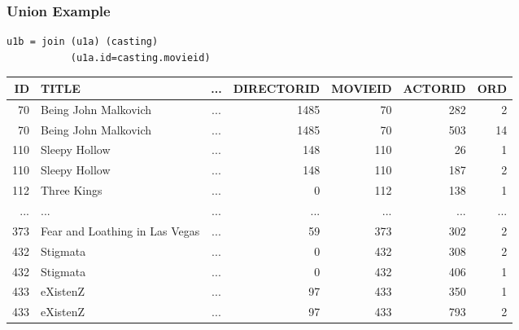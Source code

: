 \documentclass[dvipsnames]{beamer}
\theoremstyle{plain}
\begin{document}
\begin{frame}[fragile]
  \frametitle{Union Example}

  \begin{example}
    \begin{lstlisting}
u1b = join (u1a) (casting)
           (u1a.id=casting.movieid)
    \end{lstlisting}

    \pause
    \begin{tiny}
    \begin{table}
      \begin{tabular}{|r|l|c|r|r|r|r|}\hline
 ID & TITLE                          & ... & DIRECTORID & MOVIEID & ACTORID & ORD\\\hline\hline
 70 & Being John Malkovich           & ... &       1485 &      70 &     282 &   2\\\hline
 70 & Being John Malkovich           & ... &       1485 &      70 &     503 &  14\\\hline
110 & Sleepy Hollow                  & ... &        148 &     110 &      26 &   1\\\hline
110 & Sleepy Hollow                  & ... &        148 &     110 &     187 &   2\\\hline
112 & Three Kings                    & ... &          0 &     112 &     138 &   1\\\hline
... & ...                            & ... &        ... &     ... &     ... & ...\\\hline
373 & Fear and Loathing in Las Vegas & ... &         59 &     373 &     302 &   2\\\hline
432 & Stigmata                       & ... &          0 &     432 &     308 &   2\\\hline
432 & Stigmata                       & ... &          0 &     432 &     406 &   1\\\hline
433 & eXistenZ                       & ... &         97 &     433 &     350 &   1\\\hline
433 & eXistenZ                       & ... &         97 &     433 &     793 &   2\\\hline
      \end{tabular}
    \end{table}
    \end{tiny}
  \end{example}
\end{frame}
\end{document}
